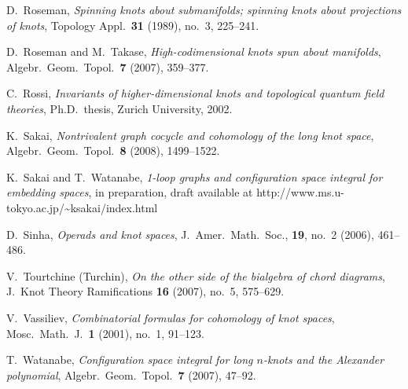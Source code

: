 \documentclass{amsart}
\theoremstyle{plain}
\theoremstyle{definition}
\numberwithin{equation}{section}
\numberwithin{figure}{section}
\numberwithin{table}{section}
\begin{document}
\begin{thebibliography}{10}
D.~Roseman, \emph{Spinning knots about submanifolds; spinning knots about projections of knots},
 Topology Appl.\ \textbf{31} (1989), no.~3, 225--241.

D.~Roseman and M.~Takase, \emph{High-codimensional knots spun about manifolds},
  Algebr.\ Geom.\ Topol.\ \textbf{7} (2007), 359--377.

C.~Rossi, \emph{Invariants of higher-dimensional knots and topological quantum field theories},
 Ph.D.\ thesis, Zurich University, 2002.

K.~Sakai, \emph{Nontrivalent graph cocycle and cohomology of the long knot space},
 Algebr.\ Geom.\ Topol.\ \textbf{8} (2008), 1499--1522.

K.~Sakai and T.~Watanabe, \emph{1-loop graphs and configuration space integral for embedding spaces},
 in preparation, draft available at
http://www.ms.u-tokyo.ac.jp/\~{}ksakai/index.html

D.~Sinha, \emph{ Operads and knot spaces},
 J.\ Amer.\ Math.\ Soc., \textbf{19}, no.\ 2 (2006), 461--486.

V.~{Tourtchine (Turchin)}, \emph{On the other side of the bialgebra of chord diagrams},
 J.\ Knot Theory Ramifications \textbf{16} (2007), no.~5, 575--629.

V.~Vassiliev, \emph{Combinatorial formulas for cohomology of knot spaces},
  Mosc.\ Math.\ J.\ \textbf{1} (2001), no.\ 1, 91--123.


T.~Watanabe, \emph{Configuration space integral for long $n$-knots and the Alexander polynomial},
 Algebr.\ Geom.\ Topol.\ \textbf{7} (2007), 47--92.
\end{thebibliography}
\end{document}
